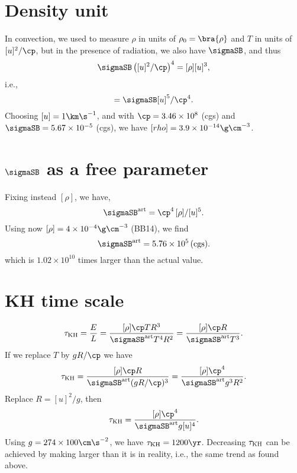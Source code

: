 \documentclass[twocolumn]{article}
\title{}
\author{}
\date{\today,~ $ $Revision: 1.101 $ $}
\begin{document}

\section{Density unit}

In convection, we used to measure $\rho$ in units of $\rho_0=\bra{\rho}$
and $T$ in units of $[u]^2/\cp$, but in the presence of radiation,
we also have $\sigmaSB$, and thus
\begin{equation}
\sigmaSB \left([u]^2/\cp\right)^4=[\rho][u]^3,
\end{equation}
i.e.,
\begin{equation}
[\rho]=\sigmaSB [u]^5/\cp^4.
\end{equation}
Choosing $[u]=1\km\s^{-1}$, and with
$\cp=3.46\times10^8$ (cgs) and
$\sigmaSB=5.67\times10^{-5}$ (cgs), we have
$[rho]=3.9\times10^{-14}\g\cm^{-3}$.

\section{$\sigmaSB$ as a free parameter}

Fixing instead $[\rho]$, we have,
\begin{equation}
\sigmaSB^{\rm art}=\cp^4\,[\rho]/[u]^5.
\end{equation}
Using now $[\rho]=4\times10^{-4}\g\cm^{-3}$ (BB14), we find
\begin{equation}
\sigmaSB^{\rm art}=5.76\times10^5 \,\mbox{(cgs)}.
\end{equation}
which is $1.02\times10^{10}$ times larger than the actual value.

\section{KH time scale}

\begin{equation}
\tau_{\rm KH}={E\over L}
={[\rho] \cp T R^3\over\sigmaSB^{\rm art} T^4 R^2}
={[\rho] \cp R\over\sigmaSB^{\rm art} T^3}.
\end{equation}
If we replace $T$ by $gR/\cp$ we have
\begin{equation}
\tau_{\rm KH}
={[\rho] \cp R\over\sigmaSB^{\rm art} (gR/\cp)^3}
={[\rho] \cp^4 \over\sigmaSB^{\rm art} g^3 R^2}.
\end{equation}
Replace $R=[u]^2/g$, then
\begin{equation}
\tau_{\rm KH}
={[\rho] \cp^4 \over\sigmaSB^{\rm art} g [u]^4}.
\end{equation}
Using $g=274\times100\cm\s^{-2}$, we have
$\tau_{\rm KH}=1200\yr$.
Decreasing $\tau_{\rm KH}$ can be achieved by making
larger than it is in reality, i.e., the same trend as
found above.
\end{document}
